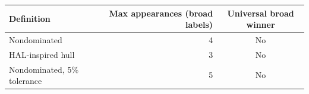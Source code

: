 \begin{tabular}{lrc}
\toprule
Definition & Max appearances (broad labels) & Universal broad winner \\
\midrule
Nondominated & 4 & No \\
HAL-inspired hull & 3 & No \\
Nondominated, 5\% tolerance & 5 & No \\
\bottomrule
\end{tabular}
